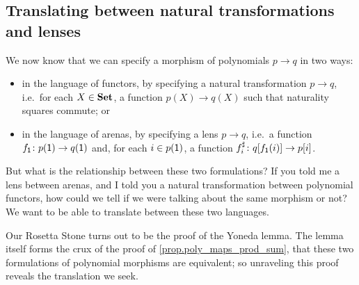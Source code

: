 \documentclass[Book-Poly]{subfiles}
\begin{document}
\subsection{Translating between natural transformations and lenses} \label{subsec.poly.func_nat.morph.translate}
We now know that we can specify a morphism of polynomials $p \to q$ in two ways:
\begin{itemize}
    \item in the language of functors, by specifying a natural transformation $p \to q$, i.e.\ for each $X\in\mathbf{Set}$, a function $p(X)\to q(X)$ such that naturality squares commute; or
    \item in the language of arenas, by specifying a lens $p\to q$, i.e.\ a function $f_{\textsf{1}} \colon p(\textsf{1}) \to q(\textsf{1})$ and, for each $i \in p(\textsf{1})$, a function $f^\sharp_i \colon q[f_{\textsf{1}}(i)] \to p[i]$.
\end{itemize}
But what is the relationship between these two formulations?
If you told me a lens between arenas, and I told you a natural transformation between polynomial functors, how could we tell if we were talking about the same morphism or not?
We want to be able to translate between these two languages.

Our Rosetta Stone turns out to be the proof of the Yoneda lemma.
The lemma itself forms the crux of the proof of \cref{prop.poly_maps_prod_sum}, that these two formulations of polynomial morphisms are equivalent; so unraveling this proof reveals the translation we seek.
\end{document}
